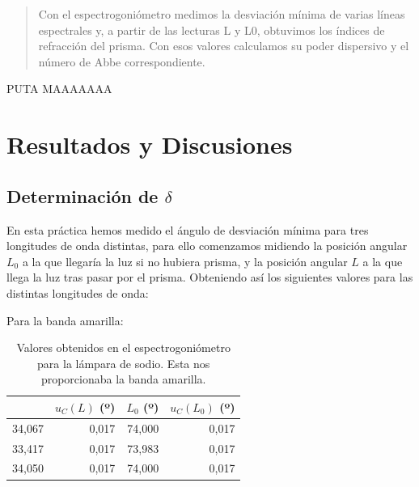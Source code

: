 \documentclass[10pt,onecolumn]{article}
\begin{document}

\tableofcontents %
\newpage

\HRule{0.5pt} %

\begin{abstract}
Con el espectrogoniómetro medimos la desviación mínima de varias líneas espectrales y, a partir de las lecturas L y L0, obtuvimos los índices de refracción del prisma. Con esos valores calculamos su poder dispersivo y el número de Abbe correspondiente.
\end{abstract}

PUTA MAAAAAAA

\section{Resultados y Discusiones}
\subsection{Determinación de $\delta$}
En esta práctica hemos medido el ángulo de desviación mínima para tres longitudes de onda distintas, para ello
comenzamos midiendo la posición angular $L_0$ a la que llegaría la luz si no hubiera prisma,
y la posición angular $L$ a la que llega la luz tras pasar por el prisma. Obteniendo así los siguientes valores para las distintas longitudes de onda:

Para la banda amarilla:

\begin{table}[H]
\centering
\begin{tabular}{|r|r|r|r|}
\hline
\rowcolor[rgb]{ .651,  .788,  .925}
\multicolumn{1}{|l|}{$L$ (º)} & \multicolumn{1}{l|}{$u_C(L)$ (º)} & \multicolumn{1}{l|}{$L_0$ (º)} & \multicolumn{1}{l|}{$u_C(L_0)$ (º)} \\ \hline
\rowcolor[rgb]{.816,  .816,  .816} 34,067 & 0,017 & 74,000 & 0,017 \\ \hline
\rowcolor[rgb]{.816,  .816,  .816} 33,417 & 0,017 & 73,983 & 0,017 \\ \hline
\rowcolor[rgb]{.816,  .816,  .816} 34,050 & 0,017 & 74,000 & 0,017 \\ \hline
\end{tabular}
\caption{Valores obtenidos en el espectrogoniómetro para la lámpara de sodio. Esta nos proporcionaba la banda amarilla.}\label{tab:banda_amarilla}
\end{table}
\end{document}
